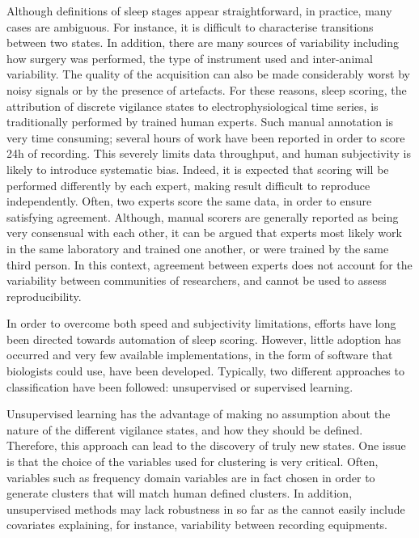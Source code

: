 Although definitions of sleep stages appear straightforward, in practice, many cases are ambiguous.
For instance, it is difficult to characterise transitions between two states.
In addition, there are many sources of variability including how surgery was performed, the type of instrument used and inter-animal variability.
The quality of the acquisition can also be made considerably worst by noisy signals or by the presence of artefacts.
For these reasons, sleep scoring, \ie{} the attribution of discrete vigilance states to electrophysiological time series,
is traditionally performed by trained human experts.
Such manual annotation is very time consuming; several hours of work have been reported in order to score 24h of recording\cite{sunagawa_faster:_2013}.
This severely limits data throughput, and human subjectivity is likely to introduce systematic bias.
Indeed, it is expected that scoring will be performed differently by each expert, making result difficult to reproduce independently.
Often, two experts score the same data, in order to ensure satisfying agreement.
Although, manual scorers are generally reported as being very consensual with
each other\cite{costa-miserachs_automated_2003,sen_comparative_2014}, it can be
argued that experts most likely work in the same laboratory and trained one another, or were trained by the same third person.
In this context, agreement between experts does not account for the variability between communities of researchers, and cannot be used to assess reproducibility.

In order to overcome both speed and subjectivity limitations, efforts have long
been directed towards automation of sleep
scoring\cite{chouvet_automatic_1980, haustein_automatic_1986}.
However, little adoption has occurred and very few available implementations, in the form of software that biologists could use, have been developed.
Typically, two different approaches to classification have been followed: unsupervised or supervised learning.

Unsupervised learning \cite{langkvist_sleep_2012,sunagawa_faster:_2013} has the
advantage of making no assumption about the nature of the different vigilance states, and how they should be defined.
Therefore, this approach can lead to the discovery of truly new states.
One issue is that the choice of the variables used for clustering is very
critical.
Often, variables such as frequency domain variables are in fact chosen in order
to generate clusters that will match human defined clusters.
In addition, unsupervised methods may lack robustness\cite{sunagawa_faster:_2013} in so far as the
cannot easily include covariates explaining, for instance, variability between recording equipments.

